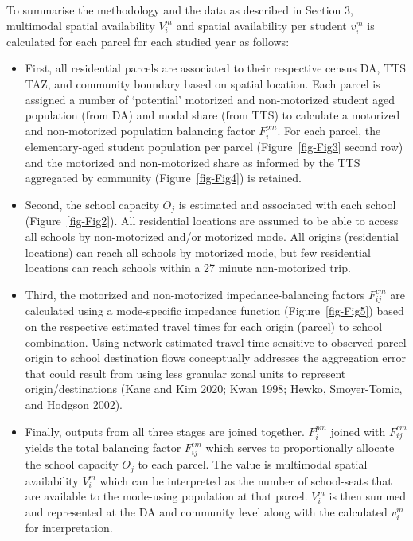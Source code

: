 \documentclass[
default
]{sn-jnl}
\providecommand{\tightlist}{%
  \setlength{\itemsep}{0pt}\setlength{\parskip}{0pt}}\usepackage{longtable,booktabs,array}
\begin{document}
To summarise the methodology and the data as described in Section 3,
multimodal spatial availability \(V_i^m\) and spatial availability per
student \(v_i^m\) is calculated for each parcel for each studied year as
follows:

\begin{itemize}
\tightlist
\item
  First, all residential parcels are associated to their respective
  census DA, TTS TAZ, and community boundary based on spatial location.
  Each parcel is assigned a number of `potential' motorized and
  non-motorized student aged population (from DA) and modal share (from
  TTS) to calculate a motorized and non-motorized population balancing
  factor \(F_{i}^{pm}\). For each parcel, the elementary-aged student
  population per parcel (Figure~\ref{fig-Fig3} second row) and the
  motorized and non-motorized share as informed by the TTS aggregated by
  community (Figure~\ref{fig-Fig4}) is retained.
\item
  Second, the school capacity \(O_j\) is estimated and associated with
  each school (Figure~\ref{fig-Fig2}). All residential locations are
  assumed to be able to access all schools by non-motorized and/or
  motorized mode. All origins (residential locations) can reach all
  schools by motorized mode, but few residential locations can reach
  schools within a 27 minute non-motorized trip.
\item
  Third, the motorized and non-motorized impedance-balancing factors
  \(F_{ij}^{cm}\) are calculated using a mode-specific impedance
  function (Figure~\ref{fig-Fig5}) based on the respective estimated
  travel times for each origin (parcel) to school combination. Using
  network estimated travel time sensitive to observed parcel origin to
  school destination flows conceptually addresses the aggregation error
  that could result from using less granular zonal units to represent
  origin/destinations (Kane and Kim 2020; Kwan 1998; Hewko,
  Smoyer-Tomic, and Hodgson 2002).
\item
  Finally, outputs from all three stages are joined together.
  \(F_{i}^{pm}\) joined with \(F_{ij}^{cm}\) yields the total balancing
  factor \(F^{tm}_{ij}\) which serves to proportionally allocate the
  school capacity \(O_j\) to each parcel. The value is multimodal
  spatial availability \(V_i^m\) which can be interpreted as the number
  of school-seats that are available to the mode-using population at
  that parcel. \(V_i^m\) is then summed and represented at the DA and
  community level along with the calculated \(v_i^m\) for
  interpretation.
\end{itemize}
\end{document}

